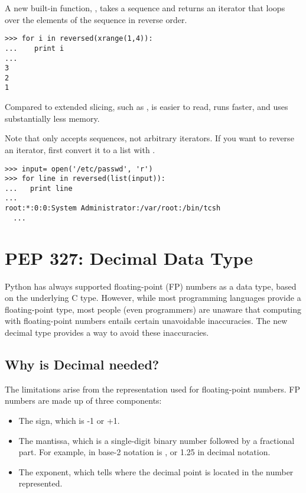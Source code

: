\documentclass{howto}
\begin{document}
A new built-in function, , takes a sequence
and returns an iterator that loops over the elements of the sequence 
in reverse order.  

\begin{verbatim}
>>> for i in reversed(xrange(1,4)):
...    print i
... 
3
2
1
\end{verbatim}

Compared to extended slicing, such as ,
 is easier to read, runs faster, and uses
substantially less memory.

Note that  only accepts sequences, not arbitrary
iterators.  If you want to reverse an iterator, first convert it to 
a list with .

\begin{verbatim}
>>> input= open('/etc/passwd', 'r')
>>> for line in reversed(list(input)):
...   print line
... 
root:*:0:0:System Administrator:/var/root:/bin/tcsh
  ...
\end{verbatim}

\begin{seealso}

\end{seealso}


\section{PEP 327: Decimal Data Type}

Python has always supported floating-point (FP) numbers as a data
type, based on the underlying C  type.  However, while
most programming languages provide a floating-point type, most people
(even programmers) are unaware that computing with floating-point
numbers entails certain unavoidable inaccuracies.  The new decimal
type provides a way to avoid these inaccuracies.

\subsection{Why is Decimal needed?}

The limitations arise from the representation used for floating-point numbers.
FP numbers are made up of three components:

\begin{itemize}
\item The sign, which is -1 or +1.
\item The mantissa, which is a single-digit binary number  
followed by a fractional part.  For example,  in base-2 notation
is , or 1.25 in decimal notation.
\item The exponent, which tells where the decimal point is located in the number represented.  
\end{itemize}
\end{document}
